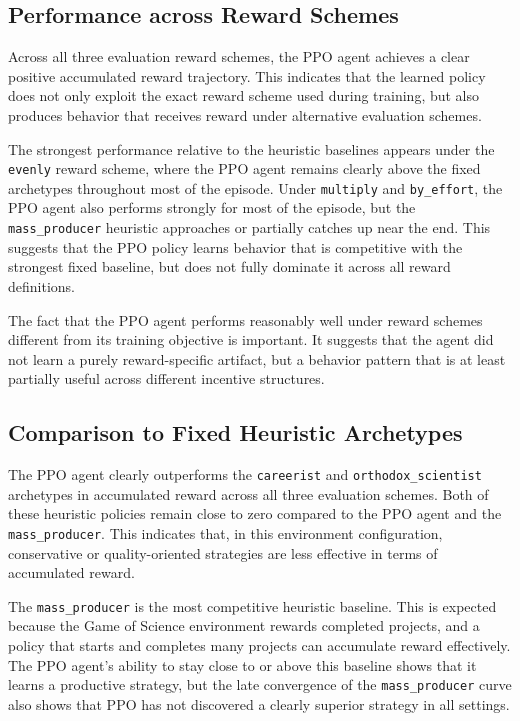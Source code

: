 \documentclass[english,bachelor]{hsluthesis}
\begin{document}
\subsection{Performance across Reward Schemes}

Across all three evaluation reward schemes, the PPO agent achieves a clear positive accumulated reward trajectory. This indicates that the learned policy does not only exploit the exact reward scheme used during training, but also produces behavior that receives reward under alternative evaluation schemes.

The strongest performance relative to the heuristic baselines appears under the \texttt{evenly} reward scheme, where the PPO agent remains clearly above the fixed archetypes throughout most of the episode. Under \texttt{multiply} and \texttt{by\_effort}, the PPO agent also performs strongly for most of the episode, but the \texttt{mass\_producer} heuristic approaches or partially catches up near the end. This suggests that the PPO policy learns behavior that is competitive with the strongest fixed baseline, but does not fully dominate it across all reward definitions.

The fact that the PPO agent performs reasonably well under reward schemes different from its training objective is important. It suggests that the agent did not learn a purely reward-specific artifact, but a behavior pattern that is at least partially useful across different incentive structures.

\subsection{Comparison to Fixed Heuristic Archetypes}

The PPO agent clearly outperforms the \texttt{careerist} and \texttt{orthodox\_scientist} archetypes in accumulated reward across all three evaluation schemes. Both of these heuristic policies remain close to zero compared to the PPO agent and the \texttt{mass\_producer}. This indicates that, in this environment configuration, conservative or quality-oriented strategies are less effective in terms of accumulated reward.

The \texttt{mass\_producer} is the most competitive heuristic baseline. This is expected because the Game of Science environment rewards completed projects, and a policy that starts and completes many projects can accumulate reward effectively. The PPO agent's ability to stay close to or above this baseline shows that it learns a productive strategy, but the late convergence of the \texttt{mass\_producer} curve also shows that PPO has not discovered a clearly superior strategy in all settings.
\end{document}
